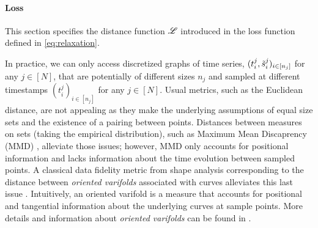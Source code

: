 


 



\vspace{-1ex}
\paragraph{Loss}
This section specifies the distance function $\mathscr{L}$ introduced in the loss function defined in \eqref{eq:relaxation}. 

In practice, we can only access discretized graphs of time series, $(t_i^j,\tilde{s}^j_i)_{i\in[n_j]}$ for any $j\in[N]$, that are potentially of 
different sizes $n_j$ and sampled at different timestamps $(t_i^j)_{i\in[n_j]}$ for any $j\in[N]$.
 Usual metrics, such as the Euclidean distance, are not appealing as they 
make the underlying assumptions of equal size sets and the existence of a pairing between points.
 Distances between measures on 
sets (taking the empirical distribution), such as Maximum Mean Discaprency (MMD) \cite{dziugaite2015training,borgwardt2006integrating}, alleviate those issues; however, MMD only accounts for positional information 
and lacks information about the time evolution between sampled points.
 A classical data fidelity metric from shape analysis 
corresponding to the distance between \textit{oriented varifolds} associated with curves alleviates this last issue \cite{kaltenmark2017general}.  
Intuitively, an oriented varifold is a measure that accounts for positional and tangential information about the underlying 
curves at sample points. More details and information about \textit{oriented varifolds} can be found in . 

